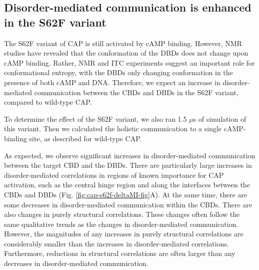 \documentclass[../main.tex]{subfiles}
\begin{document}
    \subsection{Disorder-mediated communication is enhanced in the S62F variant}
        The S62F variant of CAP is still activated by cAMP binding\cite{Tzeng:2009im,Tzeng:2012cu,Dai:2004ea,Aiba:1985ui}. However, NMR studies have revealed that the conformation of the DBDs does not change upon cAMP binding. Rather, NMR and ITC experiments suggest an important role for conformational entropy, with the DBDs only changing conformation in the presence of both cAMP and DNA\cite{Tzeng:2009im,Tzeng:2012cu}. Therefore, we expect an increase in disorder-mediated communication between the CBDs and DBDs in the S62F variant, compared to wild-type CAP.

        To determine the effect of the S62F variant, we also ran 1.5 $\mu$s of simulation of this variant. Then we calculated the holistic communication to a single cAMP-binding site, as described for wild-type CAP.

        As expected, we observe significant increases in disorder-mediated communication between the target CBD and the DBDs.  There are particularly large increases in disorder-mediated correlations in regions of known importance for CAP activation, such as the central hinge region and along the interfaces between the CBDs and DBDs (Fig. \ref{fig:cap-s62f-deltaMI-fig}A). At the same time, there are some decreases in disorder-mediated communication within the CBDs. There are also changes in purely structural correlations. These changes often follow the same qualitative trends as the changes in disorder-mediated communication. However, the magnitudes of any increases in purely structural correlations are considerably smaller than the increases in disorder-mediated correlations. Furthermore, reductions in structural correlations are often larger than any decreases in disorder-mediated communication.
\end{document}

